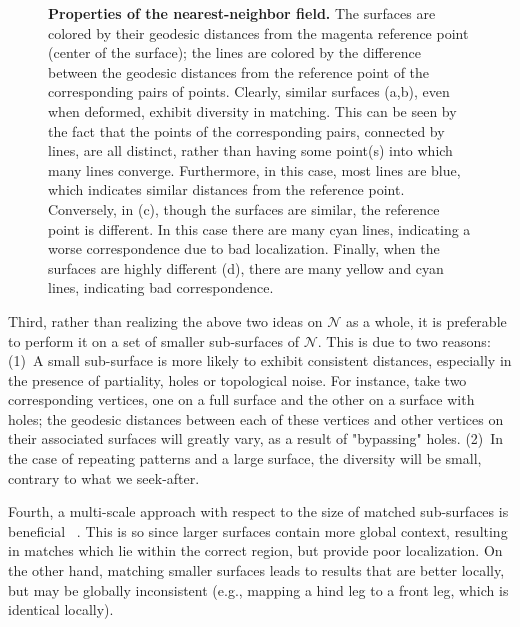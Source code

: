 \begin{figure}[h!]
	\caption{{\textbf{Properties of the nearest-neighbor field.}}
	The surfaces are colored by their geodesic distances from the magenta reference point (center of the surface); the lines are colored by the difference between the geodesic distances from the reference point of the corresponding pairs of points.
	Clearly, similar surfaces (a,b), even when deformed, exhibit diversity in matching.
	This can be seen by the fact that the points of the corresponding pairs, connected by lines, are all distinct, rather than having some point(s) into which many lines converge.
	Furthermore, in this case, most lines are blue, which indicates similar distances from the reference point.
	Conversely, in (c), though the surfaces are similar, the reference point is different.
	In this case there are many cyan lines, indicating a worse correspondence due to  bad localization.
	Finally, when the surfaces are highly different (d), there are many yellow and cyan lines, indicating bad correspondence.
}

	\label{fig:NNF}
\end{figure}

Third, rather than realizing the above two ideas on $\mathcal{N}$ as a whole, it is preferable to perform it on a set of smaller sub-surfaces of $\mathcal{N}$.
This is due to two reasons:
(1)~A small sub-surface is more likely to exhibit consistent distances, especially in the presence of partiality, holes or topological noise.
For instance, take two corresponding vertices, one on a full surface and the other on a surface with holes; the geodesic distances between each of these vertices and other vertices on their associated surfaces will greatly vary, as a result of "bypassing" holes.
(2)~In the case of repeating patterns and a large surface, the diversity will be small, contrary to what we seek-after. 

Fourth, a multi-scale approach with respect to the size of matched sub-surfaces is beneficial ~\cite{raviv2011hierarchical}.
This is so since larger surfaces contain more global context, resulting in matches which lie within the correct region, but provide poor localization.
On the other hand, matching smaller surfaces leads to results that are better locally, but may be globally inconsistent (e.g., mapping a hind leg to a front leg, which is identical locally).



